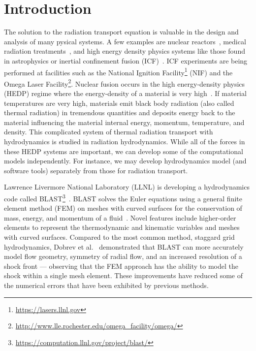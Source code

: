 \documentclass[12pt,letterpaper]{article}
\begin{document}
\section{Introduction}
The solution to the radiation transport equation is valuable in the design and analysis of many pysical systems. A few examples are nuclear reactors~\cite{D&H}, medical radiation treatments~\cite{Sandwall2018Brachytherapy}, and high energy density physics systems like those found in astrophysics or inertial confinement fusion (ICF)~\cite{Castor_Rad_Hydro}. ICF experiments are being performed at facilities such as the National Ignition Facility\footnote{\url{https://lasers.llnl.gov}} (NIF) and the Omega Laser Facility\footnote{\url{http://www.lle.rochester.edu/omega_facility/omega/}}. Nuclear fusion occurs in the high energy-density physics (HEDP) regime where the energy-density of a material is very high~\cite{Castor_Rad_Hydro,DrakeHEDPPaper}. If material temperatures are very high, materials emit black body radiation (also called thermal radiation) in tremendous quantities and deposits energy back to the material influencing the material internal energy, momentum, temperature, and density. This complicated system of thermal radiation transport with hydrodynamics is studied in radiation hydrodynamics. While all of the forces in these HEDP systems are important, we can develop some of the computational models independently. For instance, we may develop hydrodynamics model (and software tools) separately from those for radiation transport.

Lawrence Livermore National Laboratory (LLNL) is developing a hydrodynamics code called BLAST\footnote{\url{https://computation.llnl.gov/project/blast/}}~\cite{DobrevHOFEMHydro}. BLAST solves the Euler equations using a general finite element method (FEM) on meshes with curved surfaces for the conservation of mass, energy, and momentum of a fluid~\cite{DobrevCurvilinearFEMHydro}. Novel features include higher-order elements to represent the thermodynamic and kinematic variables and meshes with curved surfaces. Compared to the most common method, staggard grid hydrodynamics, Dobrev et al.~\cite{DobrevCurvilinearFEMHydro} demonstrated that BLAST can more accurately model flow geometry, symmetry of radial flow, and an increased resolution of a shock front --- observing that the FEM approach has the ability to model the shock within a single mesh element. These improvements have reduced some of the numerical errors that have been exhibited by previous methods.
\end{document}
